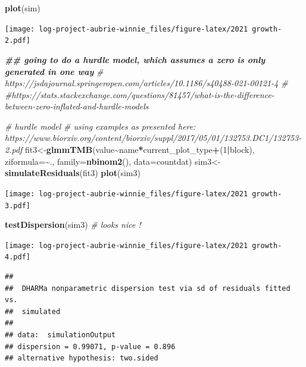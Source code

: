 \documentclass[
]{article}
\newenvironment{Shaded}{\begin{snugshade}}{\end{snugshade}}
\newcommand{\AttributeTok}[1]{\textcolor[rgb]{0.13,0.29,0.53}{#1}}
\newcommand{\CommentTok}[1]{\textcolor[rgb]{0.56,0.35,0.01}{\textit{#1}}}
\newcommand{\DecValTok}[1]{\textcolor[rgb]{0.00,0.00,0.81}{#1}}
\newcommand{\DocumentationTok}[1]{\textcolor[rgb]{0.56,0.35,0.01}{\textbf{\textit{#1}}}}
\newcommand{\FunctionTok}[1]{\textcolor[rgb]{0.13,0.29,0.53}{\textbf{#1}}}
\newcommand{\NormalTok}[1]{#1}
\newcommand{\OtherTok}[1]{\textcolor[rgb]{0.56,0.35,0.01}{#1}}
\newcommand{\SpecialCharTok}[1]{\textcolor[rgb]{0.81,0.36,0.00}{\textbf{#1}}}
\begin{document}
\begin{Shaded}
\begin{Highlighting}[]
 \FunctionTok{plot}\NormalTok{(sim)}
\end{Highlighting}
\end{Shaded}

\texttt{[image: log-project-aubrie-winnie\_files/figure-latex/2021 growth-2.pdf]}

\begin{Shaded}
\begin{Highlighting}[]
\DocumentationTok{\#\# going to do a hurdle model, which assumes a zero is only generated in one way }
\CommentTok{\# https://jsdajournal.springeropen.com/articles/10.1186/s40488{-}021{-}00121{-}4}
\CommentTok{\# \#https://stats.stackexchange.com/questions/81457/what{-}is{-}the{-}difference{-}between{-}zero{-}inflated{-}and{-}hurdle{-}models}

\CommentTok{\# hurdle model }
\CommentTok{\# using examples as presented here: https://www.biorxiv.org/content/biorxiv/suppl/2017/05/01/132753.DC1/132753{-}2.pdf }
\NormalTok{fit3}\OtherTok{\textless{}{-}}\FunctionTok{glmmTMB}\NormalTok{(value}\SpecialCharTok{\textasciitilde{}}\NormalTok{name}\SpecialCharTok{*}\NormalTok{current\_plot\_type}\SpecialCharTok{+}\NormalTok{(}\DecValTok{1}\SpecialCharTok{|}\NormalTok{block), }\AttributeTok{ziformula=}\SpecialCharTok{\textasciitilde{}}\NormalTok{., }\AttributeTok{family=}\FunctionTok{nbinom2}\NormalTok{(), }\AttributeTok{data=}\NormalTok{countdat)}
\NormalTok{ sim3}\OtherTok{\textless{}{-}}\FunctionTok{simulateResiduals}\NormalTok{(fit3)}
 \FunctionTok{plot}\NormalTok{(sim3)}
\end{Highlighting}
\end{Shaded}

\texttt{[image: log-project-aubrie-winnie\_files/figure-latex/2021 growth-3.pdf]}

\begin{Shaded}
\begin{Highlighting}[]
 \FunctionTok{testDispersion}\NormalTok{(sim3) }\CommentTok{\# looks nice ! }
\end{Highlighting}
\end{Shaded}

\texttt{[image: log-project-aubrie-winnie\_files/figure-latex/2021 growth-4.pdf]}

\begin{verbatim}
## 
##  DHARMa nonparametric dispersion test via sd of residuals fitted vs.
##  simulated
## 
## data:  simulationOutput
## dispersion = 0.99071, p-value = 0.896
## alternative hypothesis: two.sided
\end{verbatim}
\end{document}
